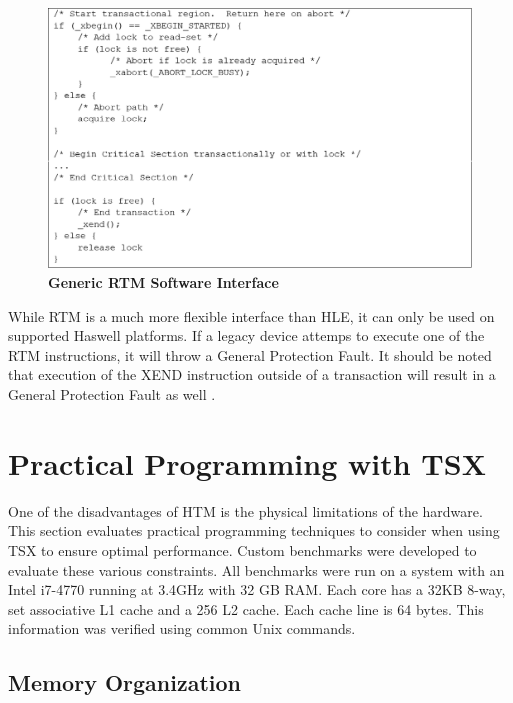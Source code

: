 \documentclass[a4paper]{article}
\begin{document}
\begin{figure}[H]
    \centering
    \graphicspath{ {./figures/} }
    \includegraphics[width=\textwidth,height=\textheight,keepaspectratio]{fig_rtmInterface}
    \caption{\textbf{Generic RTM Software Interface}}
    \label{fig:rtm_interface}
\end{figure}

\indent 
While RTM is a much more flexible interface than HLE, it can only be
used on supported Haswell platforms.  If a legacy device attemps to execute one
of the RTM instructions, it will throw a General Protection Fault.  It should
be noted that execution of the XEND instruction outside of a transaction
will result in a General Protection Fault as well \cite{intel_opt_man}.
\par

\newpage
\section{\textbf{Practical Programming with TSX}}

\indent 
One of the disadvantages of HTM is the physical limitations of the
hardware.  This section evaluates practical programming techniques to consider
when using TSX to ensure optimal performance.  Custom benchmarks were developed
to evaluate these various constraints.  All benchmarks were run on a system with
an Intel i7-4770 running at 3.4GHz with 32 GB RAM.  Each core has a 32KB 8-way,
set associative L1 cache and a 256 L2 cache.  Each cache line is 64 bytes.  This
information was verified using common Unix commands.
\par

\subsection{\textbf{Memory Organization}}
\end{document}
